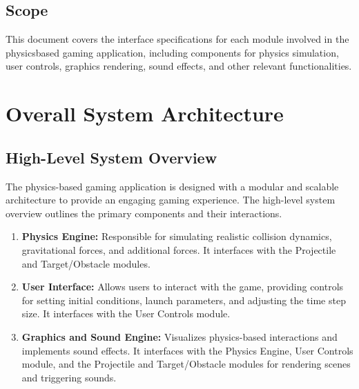 \documentclass[12pt, titlepage]{article}
\begin{document}
\subsection{Scope}
This document covers the interface specifications for each module involved in the physicsbased gaming application, including components for physics simulation, user controls, graphics rendering, sound effects, and other relevant functionalities.

\section{Overall System Architecture}
\subsection{High-Level System Overview}
The physics-based gaming application is designed with a modular and scalable architecture to provide an engaging gaming experience. The high-level system overview outlines the primary components and their interactions.

\begin{enumerate}
  \item \textbf{Physics Engine:} Responsible for simulating realistic collision dynamics, gravitational forces, and additional forces. It interfaces with the Projectile and Target/Obstacle modules.

  \item \textbf{User Interface:} Allows users to interact with the game, providing controls for setting initial conditions, launch parameters, and adjusting the time step size. It interfaces with the User Controls module.

  \item \textbf{Graphics and Sound Engine:} Visualizes physics-based interactions and implements sound effects. It interfaces with the Physics Engine, User Controls module, and the Projectile and Target/Obstacle modules for rendering scenes and triggering sounds.

\end{enumerate}
\end{document}
